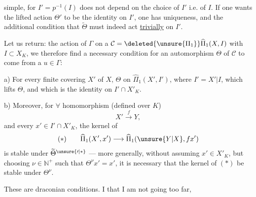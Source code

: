  simple,  for $I'=p^{-1}(I)$ does not depend on the choice of $I'$ i.e. of $I$. If one wants the lifted action $\Theta'$ to be the identity on $I'$, one has uniqueness, and the additional condition that $\widetilde{\Theta}$ must indeed act \uline{trivially} on $I'$.

Let us return: the action of $\Gamma$  on a $\mathcal{C}=\deleted{\unsure{\Pi_1}}\widehat{\Pi}_1(X,I)$ with $I\subset X_K$, we therefore find a necessary condition for an automorphism $\Theta$ of $\mathcal{C}$  to come from a $u\in\Gamma$:

a) For every finite  covering $X'$ of $X$,     $\Theta$ on $\widehat{\Pi}_1(X',I')$, where $I'=X'|I$, which lifts $\Theta$, and which is the identity on $I'\cap X'_K$.

b) Moreover, for $\forall$ homomorphism (defined over $K$)
\[
X'\xrightarrow{f}Y,
\]
and every $x'\in I'\cap X'_K$, the kernel of
\[
(*)\qquad\widehat{\Pi}_1(X',x')\longrightarrow\widehat{\Pi}_1(\unsure{Y|X},f x')
\]
is stable under $\widetilde{\Theta}^{\unsure{\prime|*}}$  --- more generally, without assuming $x'\in X'_K$, but choosing $\nu\in\mathbb{N}^{+}$ such that $\Theta^\nu x'=x'$, it is necessary that \deleted{$\Theta$} the kernel of $(*)$ be stable under $\Theta^\nu$.

These are draconian conditions. I  that I am not going too far,
